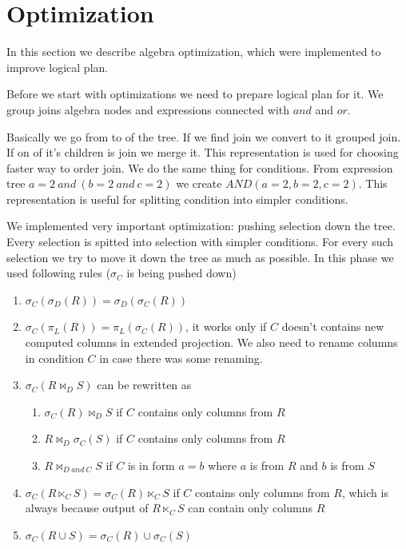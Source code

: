 \section{Optimization}

In this section we describe algebra optimization, which were implemented to improve logical plan.

Before we start with optimizations we need to prepare logical plan for it. We group joins algebra nodes and expressions connected with $and$ and $or$.

Basically we go from to of the tree. If we find join we convert to it grouped join. If on of it's children is join we merge it. This representation is used for choosing faster way to order join. We do the same thing for conditions. From expression tree $a=2~and~(b=2~and~c=2)$ we create $AND(a=2,b=2,c=2)$. This representation is useful for splitting condition into simpler conditions.

We implemented very important optimization: pushing selection down the tree. Every selection is spitted into selection with simpler conditions. For every such selection we try to move it down the tree as much as possible. In this phase we used following rules ($\sigma_C$ is being pushed down)
\begin{enumerate}
\item $\sigma_C(\sigma_D(R))=\sigma_D(\sigma_C(R))$
\item $\sigma_C(\pi_L(R))=\pi_L(\sigma_C(R))$, it works only if $C$ doesn't contains new computed columns in extended projection. We also need to rename columns in condition $C$ in case there was some renaming.
\item  $\sigma_C(R \Join_D S)$ can be rewritten as
\begin{enumerate}
\item $\sigma_C(R) \Join_D S$ if $C$ contains only columns from $R$
\item $R \Join_D \sigma_C(S)$ if $C$ contains only columns from $R$
\item $R \Join_{D~and~C} S$ if $C$ is in form $a=b$ where $a$ is from $R$ and $b$ is from $S$
\end{enumerate}
\item $\sigma_C(R \ltimes_C S)=\sigma_C(R)\ltimes_C S$ if $C$  contains only columns from $R$, which is always because output of $R \ltimes_C S$ can contain only columns $R$
\item $\sigma_C(R\cup S)=\sigma_C(R)\cup \sigma_C(S)$
\end{enumerate}

